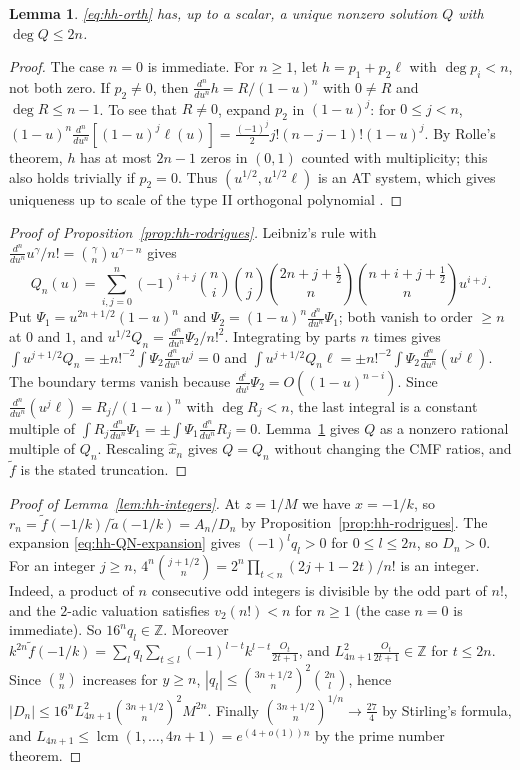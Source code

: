 \documentclass[oneside,english,11pt]{amsart}
\newtheorem{lemma}[thm]{Lemma}
\DeclareMathOperator{\lcm}{lcm}
\begin{document}
\begin{lemma}\label{lem:hh-unique}
\eqref{eq:hh-orth} has, up to a scalar, a unique nonzero solution $Q$ with $\deg Q\le2n$.
\end{lemma}
\begin{proof}
The case $n=0$ is immediate. For $n\ge1$, let $h=p_1+p_2\ell$ with $\deg p_i<n$, not both zero. If $p_2\ne0$, then $\frac{d^n}{du^n}h=R/(1-u)^n$ with $0\ne R$ and $\deg R\le n-1$.
To see that $R\ne0$, expand $p_2$ in $(1-u)^j$: for $0\le j<n$,
$(1-u)^n\frac{d^n}{du^n}[(1-u)^j\ell(u)]=\frac{(-1)^j}{2}j!(n-j-1)!(1-u)^j$.
By Rolle's theorem, $h$ has at most $2n-1$ zeros in $(0,1)$ counted with multiplicity; this also holds trivially if
$p_2=0$. Thus $(u^{1/2},u^{1/2}\ell)$ is an AT system, which gives uniqueness up to scale of the type II orthogonal polynomial \cite{nikishin1991rational}.
\end{proof}

\begin{proof}[Proof of Proposition~\ref{prop:hh-rodrigues}]
Leibniz's rule with $\frac{d^n}{du^n}u^\gamma/n!=\binom\gamma nu^{\gamma-n}$ gives
\begin{equation}\label{eq:hh-QN-expansion}
 Q_n(u)=\sum_{i,j=0}^n(-1)^{i+j}\binom ni\binom nj\binom{2n+j+\frac12}n\binom{n+i+j+\frac12}nu^{i+j}.
\end{equation} Put $\Psi_1=u^{2n+1/2}(1-u)^n$ and $\Psi_2=(1-u)^n\frac{d^n}{du^n}\Psi_1$;
both vanish to order $\ge n$ at $0$ and $1$, and $u^{1/2}Q_n=\frac{d^n}{du^n}\Psi_2/n!^2$. Integrating by parts $n$ times gives
$\int u^{j+1/2}Q_n=\pm n!^{-2}\int\Psi_2\frac{d^n}{du^n}u^j=0$ and $\int u^{j+1/2}Q_n\ell=\pm n!^{-2}\int\Psi_2\frac{d^n}{du^n}(u^j\ell)$. The boundary terms
vanish because $\frac{d^i}{du^i}\Psi_2=O((1-u)^{n-i})$. Since $\frac{d^n}{du^n}(u^j\ell)=R_j/(1-u)^n$ with $\deg R_j<n$, the last integral is a constant multiple of
$\int R_j\frac{d^n}{du^n}\Psi_1=\pm\int\Psi_1\frac{d^n}{du^n}R_j=0$. Lemma~\ref{lem:hh-unique} gives $Q$ as a nonzero rational multiple of $Q_n$. Rescaling $\hat x_n$ gives $Q=Q_n$ without changing the CMF ratios, and $\tilde f$ is the stated truncation.
\end{proof}

\begin{proof}[Proof of Lemma~\ref{lem:hh-integers}]
At $z=1/M$ we have $x=-1/k$, so $r_n=\tilde f(-1/k)/\tilde a(-1/k)=A_n/D_n$ by Proposition~\ref{prop:hh-rodrigues}.
The expansion \eqref{eq:hh-QN-expansion} gives $(-1)^lq_l>0$ for $0\le l\le2n$, so $D_n>0$.
For an integer $j\ge n$, $4^n\binom{j+1/2}n=2^n\prod_{t<n}(2j+1-2t)/n!$ is an integer. Indeed, a product of $n$
consecutive odd integers is divisible by the odd part of $n!$, and the $2$-adic valuation satisfies $v_2(n!)<n$ for $n\ge1$ (the case $n=0$ is immediate). So $16^nq_l\in\mathbb Z$. Moreover
$k^{2n}\tilde f(-1/k)=\sum_lq_l\sum_{t\le l}(-1)^{l-t}k^{l-t}\frac{O_t}{2t+1}$, and $L_{4n+1}^2\frac{O_t}{2t+1}\in\mathbb Z$ for $t\le2n$. Since
$\binom yn$ increases for $y\ge n$, $|q_l|\le\binom{3n+1/2}n^2\binom{2n}l$, hence $|D_n|\le16^nL_{4n+1}^2\binom{3n+1/2}n^2M^{2n}$. Finally
$\binom{3n+1/2}n^{1/n}\to\frac{27}4$ by Stirling's formula, and $L_{4n+1}\le\lcm(1,\dots,4n+1)=e^{(4+o(1))n}$ by the prime number theorem.
\end{proof}
\end{document}
